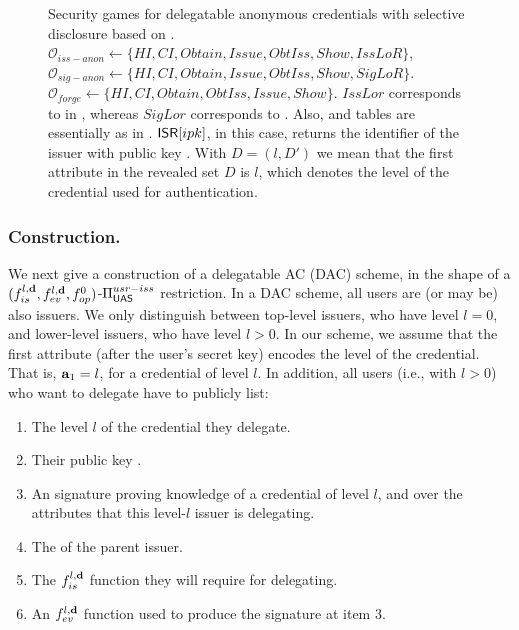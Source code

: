 \begin{figure}[ht!]
{  }
  \caption{Security games for delegatable anonymous credentials with selective
    disclosure based on \cite{fhs19}. $\mathcal{O}_{iss-anon} \gets \lbrace HI,
    CI,Obtain,Issue,ObtIss,Show,IssLoR\rbrace$, $\mathcal{O}_{sig-anon} \gets
    \lbrace HI,CI,Obtain,Issue,ObtIss,Show,SigLoR\rbrace$. $\mathcal{O}_{forge}
    \gets \lbrace HI,CI,Obtain,ObtIss,Issue,Show\rbrace$. $IssLor$ corresponds
    to \OBTCHALb in \UAS, whereas $SigLor$ corresponds to \CHALb. Also, \OWNR
    and \ATTR tables are essentially as in .
    $\mathsf{ISR}[ipk]$, in this case, returns the identifier of the issuer with public
    key \ipk. With $D = (l,D')$ we mean that the first attribute in the revealed
    set $D$ is $l$, which denotes the level of the credential used for
    authentication.}
  \label{fig:model-dac}  
\end{figure}

\subsubsection{\CUASDAC Construction.} %
We next give a construction of a delegatable AC (DAC) scheme, in the shape of
a $(f_{is}^{l,\mathbf{d}},f_{ev}^{l,\mathbf{d}},f_{op}^0)$-$\Pi_{\mathsf{UAS}}^{usr-iss}$
restriction. In a DAC scheme, all users are (or may be) also issuers. We only
distinguish between top-level issuers, who have level $l=0$, and lower-level
issuers, who have level $l>0$. In our \CUASDAC scheme, we assume that the first
attribute (after the user's secret key) encodes the level of the credential.
That is, $\mathbf{a}_1=l$, for a credential of level $l$. In addition, all users
(i.e., with $l>0$) who want to delegate have to publicly list:

\begin{enumerate}
\item The level $l$ of the credential they delegate.
\item Their public key \ipk.
\item An \UAS signature proving knowledge of a credential of level $l$, and over
  the attributes that this level-$l$ issuer is delegating.
\item The \ipk of the parent issuer.
\item The $f_{is}^{l,\mathbf{d}}$ function they will require for delegating.
\item An $f_{ev}^{l,\mathbf{d}}$ function used to produce the signature at item 3.
\end{enumerate}

